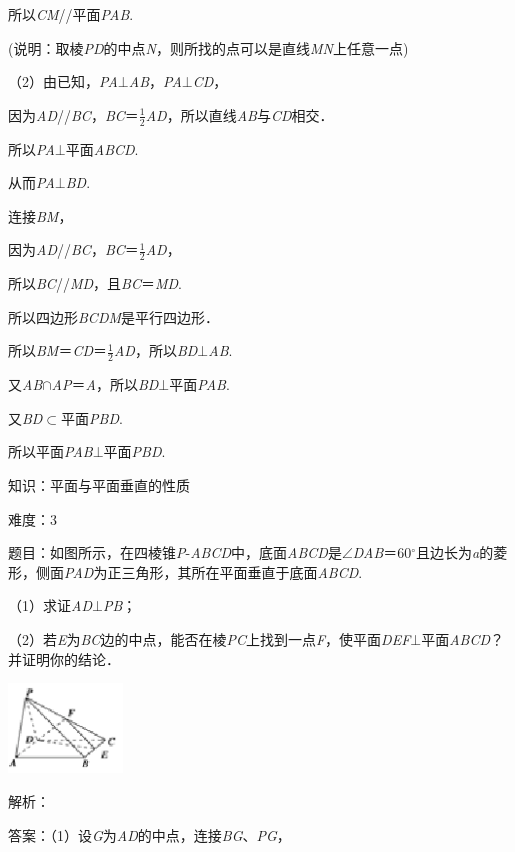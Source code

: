 \documentclass{article} %
\begin{document}
所以\textit{CM}//平面\textit{PAB}.

(说明：取棱\textit{PD}的中点\textit{N}，则所找的点可以是直线\textit{MN}上任意一点)

（2）由已知，\textit{PA}$\mathrm{\bot}$\textit{AB}，\textit{PA}$\mathrm{\bot}$\textit{CD}，

因为\textit{AD}//\textit{BC}，\textit{BC}＝$\frac{1}{2}$\textit{AD}，所以直线\textit{AB}与\textit{CD}相交．

所以\textit{PA}$\mathrm{\bot}$平面\textit{ABCD}.

从而\textit{PA}$\mathrm{\bot}$\textit{BD}.

连接\textit{BM}，

因为\textit{AD}//\textit{BC}，\textit{BC}＝$\frac{1}{2}$\textit{AD}，

所以\textit{BC}//\textit{MD}，且\textit{BC}＝\textit{MD}.

所以四边形\textit{BCDM}是平行四边形．

所以\textit{BM}＝\textit{CD}＝$\frac{1}{2}$\textit{AD}，所以\textit{BD}$\mathrm{\bot}$\textit{AB}.

又\textit{AB}$\mathrm{\cap}$\textit{AP}＝\textit{A}，所以\textit{BD}$\mathrm{\bot}$平面\textit{PAB}.

又\textit{BD}$\mathrm{\subset }$平面\textit{PBD}.

所以平面\textit{PAB}$\mathrm{\bot}$平面\textit{PBD}.

知识：平面与平面垂直的性质

难度：3

题目：如图所示，在四棱锥\textit{P}-\textit{ABCD}中，底面\textit{ABCD}是$\mathrm{\angle}$\textit{DAB}＝60$\mathrm{{}^\circ}$且边长为\textit{a}的菱形，侧面\textit{PAD}为正三角形，其所在平面垂直于底面\textit{ABCD}.

（1）求证\textit{AD}$\mathrm{\bot}$\textit{PB}；

（2）若\textit{E}为\textit{BC}边的中点，能否在棱\textit{PC}上找到一点\textit{F}，使平面\textit{DEF}$\mathrm{\bot}$平面\textit{ABCD}？并证明你的结论．

\includegraphics*[width=1.20in, height=0.94in, keepaspectratio=false]{image260}

解析：

答案：（1）设\textit{G}为\textit{AD}的中点，连接\textit{BG}、\textit{PG}，
\end{document}
